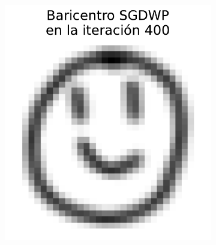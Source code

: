 \begin{figure}[H]
\begin{subfigure}[b]{0.17\textwidth}
        \label{fig:bar-SGDWP-random-walk-iter-03}
    \end{subfigure}
    \hfill
    \begin{subfigure}[b]{0.17\textwidth}
        \centering
        \includegraphics[width=\textwidth]{img/sgdwp-rw/bar-SGDWP-random-walk-iter-04.pdf}
        \label{fig:bar-SGDWP-random-walk-iter-04}
    \end{subfigure}
    \hfill
    \begin{subfigure}[b]{0.17\textwidth}
        \centering

\end{subfigure}
\end{figure}
